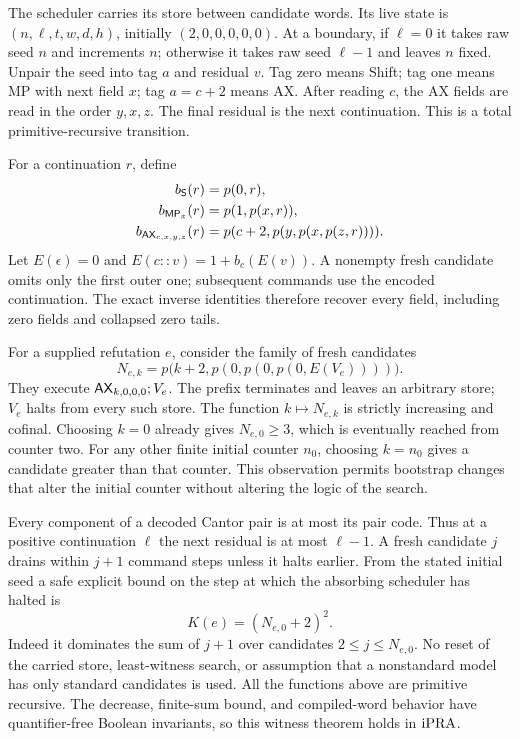 The scheduler carries its store between candidate words. Its live state
is $(n,\ell,t,w,d,h)$, initially $(2,0,0,0,0,0)$. At a boundary, if
$\ell=0$ it takes raw seed $n$ and increments $n$; otherwise it takes
raw seed $\ell-1$ and leaves $n$ fixed. Unpair the seed into tag $a$
and residual $v$. Tag zero means Shift; tag one means MP with next
field $x$; tag $a=c+2$ means AX. After reading $c$, the AX fields are
read in the order $y,x,z$. The final residual is the next continuation.
This is a total primitive-recursive transition.

For a continuation $r$, define
\[
 \begin{split}
 b_{\mathsf{S}}(r)&=p(0,r),\\
 b_{\mathsf{MP}_x}(r)&=p(1,p(x,r)),\\
 b_{\mathsf{AX}_{c,x,y,z}}(r)&=p(c+2,p(y,p(x,p(z,r)))).
 \end{split}
\]
Let $E(\epsilon)=0$ and $E(c::v)=1+b_c(E(v))$.
A nonempty fresh candidate omits only the first outer one; subsequent
commands use the encoded continuation. The exact inverse identities
therefore recover every field, including zero fields and collapsed
zero tails.

For a supplied refutation $e$, consider the family of fresh candidates
\[
 N_{e,k}=p\bigl(k+2,p(0,p(0,p(0,E(V_e))))\bigr).
\]
They execute $\mathsf{AX}_{k,0,0,0};V_e$. The prefix terminates and leaves
an arbitrary store; $V_e$ halts from every such store. The function
$k\mapsto N_{e,k}$ is strictly increasing and cofinal. Choosing $k=0$
already gives $N_{e,0}\ge3$, which is eventually reached from counter
two. For any other finite initial counter $n_0$, choosing $k=n_0$
gives a candidate greater than that counter. This observation permits
bootstrap changes that alter the initial counter without altering
the logic of the search.

Every component of a decoded Cantor pair is at most its pair code.
Thus at a positive continuation $\ell$ the next residual is at most
$\ell-1$. A fresh candidate $j$ drains within $j+1$ command steps
unless it halts earlier. From the stated initial seed a safe explicit
bound on the step at which the absorbing scheduler has halted is
\[
 K(e)=(N_{e,0}+2)^2.
\]
Indeed it dominates the sum of $j+1$ over candidates $2\le j\le
N_{e,0}$. No reset of the carried store, least-witness search, or
assumption that a nonstandard model has only standard candidates is
used. All the functions above are primitive recursive. The
decrease, finite-sum bound, and compiled-word behavior have
quantifier-free Boolean invariants, so this witness theorem holds in
$\mathrm{iPRA}$.

